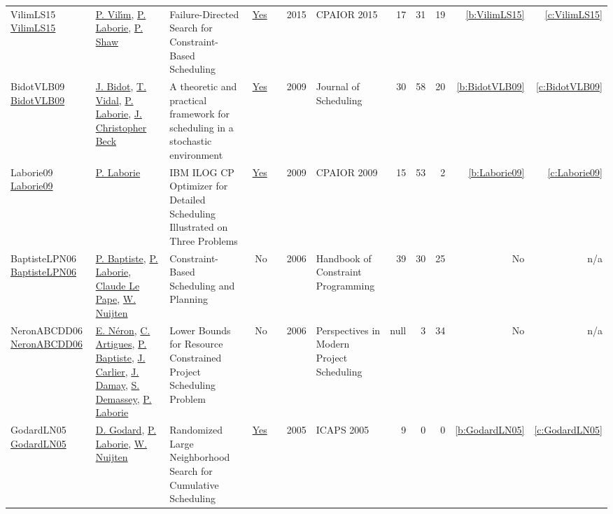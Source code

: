 {\begin{longtable}{>{\raggedright\arraybackslash}p{3cm}>{\raggedright\arraybackslash}p{6cm}>{\raggedright\arraybackslash}p{6.5cm}rrrp{2.5cm}rrrrr}
VilimLS15 \href{https://doi.org/10.1007/978-3-319-18008-3\_30}{VilimLS15} & \hyperref[auth:a121]{P. Vil{\'{\i}}m}, \hyperref[auth:a118]{P. Laborie}, \hyperref[auth:a120]{P. Shaw} & Failure-Directed Search for Constraint-Based Scheduling & \href{works/VilimLS15.pdf}{Yes} & \cite{VilimLS15} & 2015 & CPAIOR 2015 & 17 & 31 & 19 & \ref{b:VilimLS15} & \ref{c:VilimLS15}\\
BidotVLB09 \href{https://doi.org/10.1007/s10951-008-0080-x}{BidotVLB09} & \hyperref[auth:a836]{J. Bidot}, \hyperref[auth:a837]{T. Vidal}, \hyperref[auth:a118]{P. Laborie}, \hyperref[auth:a89]{J. Christopher Beck} & A theoretic and practical framework for scheduling in a stochastic environment & \href{works/BidotVLB09.pdf}{Yes} & \cite{BidotVLB09} & 2009 & Journal of Scheduling & 30 & 58 & 20 & \ref{b:BidotVLB09} & \ref{c:BidotVLB09}\\
Laborie09 \href{https://doi.org/10.1007/978-3-642-01929-6\_12}{Laborie09} & \hyperref[auth:a118]{P. Laborie} & {IBM} {ILOG} {CP} Optimizer for Detailed Scheduling Illustrated on Three Problems & \href{works/Laborie09.pdf}{Yes} & \cite{Laborie09} & 2009 & CPAIOR 2009 & 15 & 53 & 2 & \ref{b:Laborie09} & \ref{c:Laborie09}\\
BaptisteLPN06 \href{https://doi.org/10.1016/S1574-6526(06)80026-X}{BaptisteLPN06} & \hyperref[auth:a164]{P. Baptiste}, \hyperref[auth:a118]{P. Laborie}, \hyperref[auth:a165]{Claude Le Pape}, \hyperref[auth:a666]{W. Nuijten} & Constraint-Based Scheduling and Planning & No & \cite{BaptisteLPN06} & 2006 & Handbook of Constraint Programming & 39 & 30 & 25 & No & n/a\\
NeronABCDD06 \href{http://dx.doi.org/10.1007/978-0-387-33768-5_7}{NeronABCDD06} & \hyperref[auth:a917]{E. Néron}, \hyperref[auth:a6]{C. Artigues}, \hyperref[auth:a164]{P. Baptiste}, \hyperref[auth:a858]{J. Carlier}, \hyperref[auth:a918]{J. Damay}, \hyperref[auth:a246]{S. Demassey}, \hyperref[auth:a118]{P. Laborie} & Lower Bounds for Resource Constrained Project Scheduling Problem & No & \cite{NeronABCDD06} & 2006 & Perspectives in Modern Project Scheduling & null & 3 & 34 & No & n/a\\
GodardLN05 \href{http://www.aaai.org/Library/ICAPS/2005/icaps05-009.php}{GodardLN05} & \hyperref[auth:a783]{D. Godard}, \hyperref[auth:a118]{P. Laborie}, \hyperref[auth:a666]{W. Nuijten} & Randomized Large Neighborhood Search for Cumulative Scheduling & \href{works/GodardLN05.pdf}{Yes} & \cite{GodardLN05} & 2005 & ICAPS 2005 & 9 & 0 & 0 & \ref{b:GodardLN05} & \ref{c:GodardLN05}\\

\end{longtable}}

